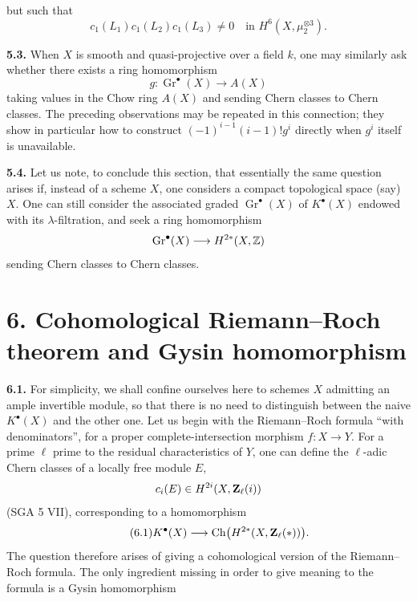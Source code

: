 but such that
\[
 c_1(L_1)c_1(L_2)c_1(L_3)\ne0
 \quad\text{in }H^6(X,\mu_2^{\otimes3}).
\]

\noindent{}\textbf{5.3.}
When $X$ is smooth and quasi-projective over a field $k$, one may similarly
ask whether there exists a ring homomorphism
\[
 g:\operatorname{Gr}^\bullet(X)\longrightarrow A(X)
\]
taking values in the Chow ring $A(X)$ and sending Chern classes to Chern
classes. The preceding observations may be repeated in this connection;
they show in particular how to construct $(-1)^{i-1}(i-1)!g^i$ directly
when $g^i$ itself is unavailable.

\noindent{}\textbf{5.4.}
Let us note, to conclude this section, that essentially the same question
arises if, instead of a scheme $X$, one considers a compact topological
space (say) $X$. One can still consider the associated graded
$\operatorname{Gr}^\bullet(X)$ of $K^\bullet(X)$ endowed with its
$\lambda$-filtration, and seek a ring homomorphism
\[
 \operatorname{Gr}^\bullet(X)\longrightarrow H^{2*}(X,\mathbb Z)
\]
sending Chern classes to Chern classes.

\section*{6. Cohomological Riemann--Roch theorem and Gysin homomorphism}

\noindent{}\textbf{6.1.}
For simplicity, we shall confine ourselves here to schemes $X$ admitting an
ample invertible module, so that there is no need to distinguish between the
naive $K^\bullet(X)$ and the other one. Let us begin with the Riemann--Roch
formula ``with denominators'', for a proper complete-intersection morphism
$f:X\longrightarrow Y$. For a prime $\ell$ prime to the residual
characteristics of $Y$, one can define the $\ell$-adic Chern classes of a
locally free module $E$,
\[
 c_i(E)\in H^{2i}(X,\mathbf Z_\ell(i))
\]
(SGA 5 VII), corresponding to a homomorphism
\begin{equation}\tag{6.1}
 K^\bullet(X)\longrightarrow \operatorname{Ch}\bigl(H^{2*}(X,\mathbf Z_\ell(*))\bigr).
\end{equation}
The question therefore arises of giving a cohomological version of the
Riemann--Roch formula. The only ingredient missing in order to give meaning
to the formula is a Gysin homomorphism


